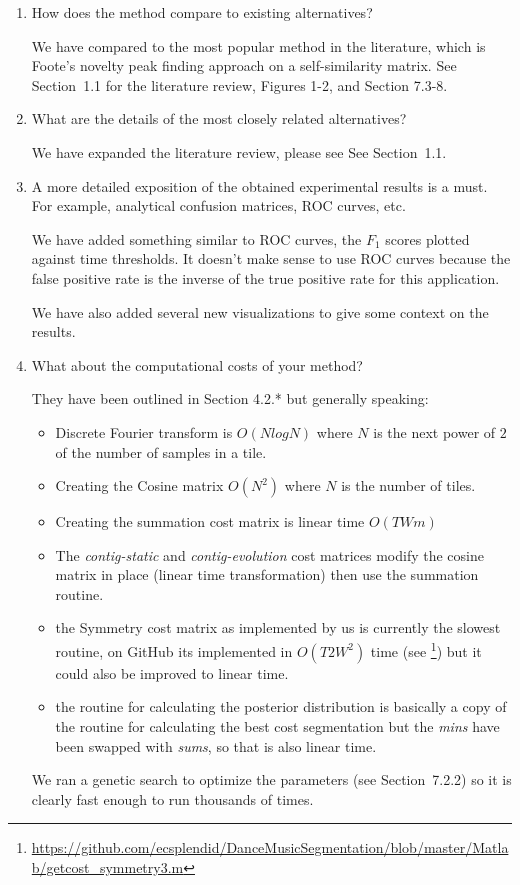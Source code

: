 \documentclass[12pt,a4paper,twoside,final,onecolumn]{article}
\begin{document}
\begin{enumerate}
\item How does the method compare to existing alternatives?

{\color{blue} We have compared to the most popular method in the literature, which is Foote's novelty peak finding approach on a self-similarity matrix. See Section~1.1 for the literature review, Figures 1-2, and Section 7.3-8.}

\item What are the details of the most closely related alternatives?

{\color{blue}We have expanded the literature review, please see See Section~1.1.}

\item A more detailed exposition of the obtained experimental results is a must. For example, analytical confusion matrices, ROC curves, etc.

{\color{blue}We have added something similar to ROC curves, the $F_1$ scores plotted against time thresholds. It doesn't make sense to use ROC curves because the false positive rate is the inverse of the true positive rate for this application. 

We have also added several new visualizations to give some context on the results.}

\item What about the computational costs of your method?

{\color{blue}
They have been outlined in Section 4.2.* but generally speaking: 

\begin{itemize}
	\item Discrete Fourier transform is $O(N log N)$ where $N$ is the next power of $2$ of the number of samples in a tile. 
	\item Creating the Cosine matrix $O(N^2)$ where $N$ is the number of tiles.
	\item Creating the summation cost matrix is linear time $O(TWm)$
	\item The \textit{contig-static} and \textit{contig-evolution} cost matrices modify the cosine matrix in place (linear time transformation) then use the summation routine. 
	\item the Symmetry cost matrix as implemented by us is currently the slowest routine, on GitHub its implemented in $O(T2W^2)$ time (see \footnote{\url{https://github.com/ecsplendid/DanceMusicSegmentation/blob/master/Matlab/getcost\_symmetry3.m}}) but it could also be improved to linear time.
	\item the routine for calculating the posterior distribution is basically a copy of the routine for calculating the best cost segmentation but the \textit{mins} have been swapped with \textit{sums}, so that is also linear time. 
\end{itemize}
	
We ran a genetic search to optimize the parameters (see Section~7.2.2) so it is clearly fast enough to run thousands of times.}

\end{enumerate}
\end{document}
